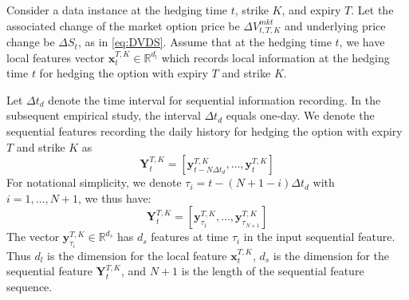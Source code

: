 \documentclass[letterpaper,12pt,titlepage,oneside,final]{book}
\numberwithin{equation}{section}
\theoremstyle{definition}
\newcommand{\vx}{\mathbf{x}}
\newcommand{\vy}{\mathbf{y}}
\newcommand{\DT}{\Delta t}
\newcommand{\Real}{\mathbb{R}}
\begin{document}
 Consider a data instance at the hedging time $t$, strike $K$, and expiry $T$. Let the associated change of the market option price  be $\Delta V^{mkt}_{t,T,K}$ and underlying price change be $\Delta S_t$, as in \eqref{eq:DVDS}.
Assume that at the hedging time $t$, we have local features vector $\vx^{T,K}_{t} \in \Real^{d_l}$ which records local information at the hedging time $t$ for hedging the option with expiry $T$ and strike $K$.

Let $\DT_{d}$ denote the time interval for sequential information recording. In  the subsequent empirical study, the interval $\DT_{d}$ equals one-day.  We denote the sequential features recording the daily history for hedging the option with expiry $T$ and strike $K$ as
\[
\mathbf{Y}_{t}^{T,K}=\left[\vy^{T,K}_{t-N \DT_{d}},\dots,\vy^{T,K}_{t}\right]
\]
For notational simplicity, we denote $\tau_i=t-(N+1-i)\DT_d$ with $i=1, \dots,N+1$, we thus have:
\[
\mathbf{Y}_{t}^{T,K}=\left[\vy^{T,K}_{\tau_{1}},\dots,\vy^{T,K}_{\tau_{N+1}}\right]
\]
The vector $\vy^{T,K}_{\tau_{i}} \in \Real^{d_s}$ has  $d_s$ features at time $\tau_{i}$ in the input sequential feature.
Thus $d_l$ is the dimension for the local feature $\vx_{t}^{T,K}$, $d_s$ is the dimension for the sequential feature $\mathbf{Y}_{t}^{T,K}$, and
$N+1$ is the length of the sequential feature sequence.
\end{document}
